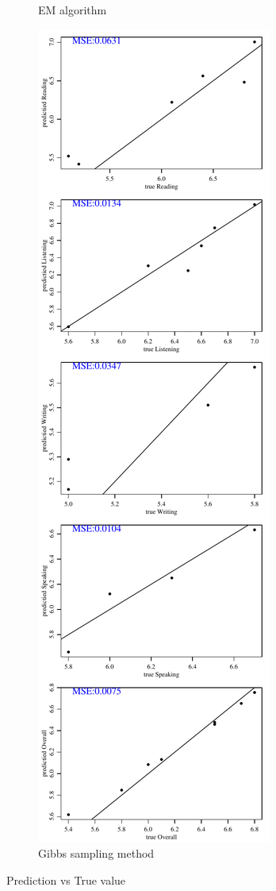 \documentclass[12pt]{article}
\begin{document}
\begin{figure}[h!]
\begin{subfigure}{0.4\textwidth}
    \caption{EM algorithm}
    \label{fig:0.15-empvt}
\end{subfigure}
\begin{subfigure}{0.4\textwidth}
    \includegraphics[height=.85\textheight]{pic/0.15/Gibbs_PredvsTrue.pdf}
    \caption{Gibbs sampling method}
    \label{fig:0.15-gibbspvt}
\end{subfigure}
        
\caption{Prediction vs True value}
\label{fig:0.15-pvt}
\end{figure}
\end{document}

